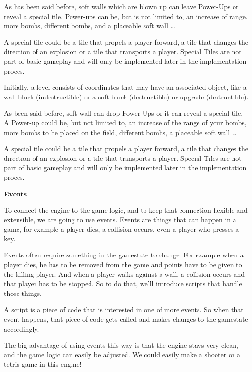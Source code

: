       As has been said before, soft walls which are blown up can leave Power-Ups or reveal a special tile. Power-ups can be, but is not limited to, an increase of range, more bombs, different bombs, and a placeable soft wall \ldots

      A special tile could be a tile that propels a player forward, a tile that changes the direction of an explosion or a tile that transports a player. Special Tiles are not part of basic gameplay and will only be implemented later in the implementation proces.

  Initially, a level consists of coordinates that may have an associated object, like a wall block (indestructible) or a soft-block (destructible) or upgrade (destructible).

      As been said before, soft wall can drop Power-Ups or it can reveal a special tile. A Power-up could be, but not limited to, an increase of the range of your bombs, more bombs to be placed on the field, different bombs, a placeable soft wall \ldots

      A special tile could be a tile that propels a player forward, a tile that changes the direction of an explosion or a tile that transports a player. Special Tiles are not part of basic gameplay and will only be implemented later in the implementation proces.
  
  \textbf{Events}
  
  To connect the engine to the game logic, and to keep that connection flexible and extensible, we are going to use events.
  Events are things that can happen in a game, for example a player dies, a collision occurs, even a player who presses a key.
  
  Events often require something in the gamestate to change. For example when a player dies, he has to be removed from the game and points have to be given to the killing player. And when a player walks against a wall, a collision occurs and that player has to be stopped. So to do that, we'll introduce scripts that handle those things.
  
  A script is a piece of code that is interested in one of more events. So when that event happens, that piece of code gets called and makes changes to the gamestate accordingly.
  
  The big advantage of using events this way is that the engine stays very clean, and the game logic can easily be adjusted. We could easily make a shooter or a tetris game in this engine!

